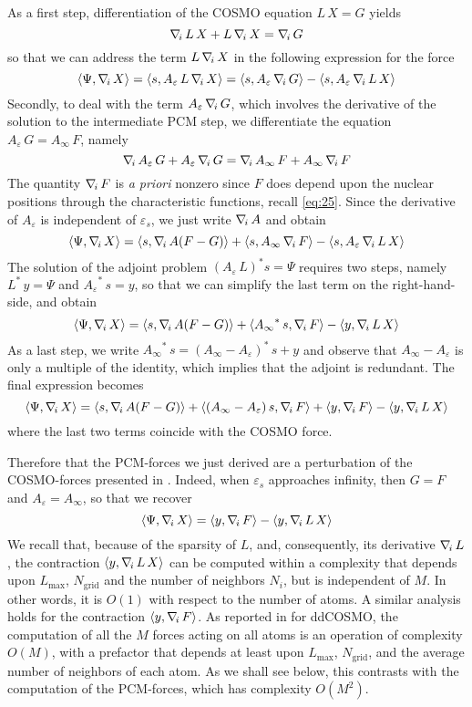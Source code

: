 As a first step, differentiation of the COSMO equation $L\, X = G$ yields
\[
\nabla_{\!i}\, L \, X + L \, \nabla_{\!i}\, X = \nabla_{\!i}\, G
\]
so that we can address the term $L \, \nabla_{\!i}\, X$ in the following expression for the force
\[
\langle \Psi , \nabla_{\!i}\, X\rangle  = \langle s ,  A_\varepsilon \, L \, \nabla_{\!i}\, X\rangle
 = \langle s ,  A_\varepsilon \, \nabla_{\!i}\, G \rangle - \langle s , A_\varepsilon \, \nabla_{\!i}\, L \,  X \rangle
\]
Secondly, to deal with the term $A_\varepsilon \, \nabla_{\!i}\, G$, which involves the derivative of the solution to the intermediate PCM step, we differentiate the equation $A_\varepsilon \, G = A_\infty \, F$, namely
\[
\nabla_{\!i}\, A_\varepsilon \, G + A_\varepsilon \, \nabla_{\!i}\, G = \nabla_{\!i}\, A_\infty \, F + A_\infty \, \nabla_{\!i}\, F
\]
The quantity $\nabla_{\!i}\, F$ is \emph{a priori} nonzero since $F$ does depend upon the nuclear positions through the characteristic functions, recall \eqref{eq:25}. Since the derivative of $A_\varepsilon$ is independent of $\varepsilon_s$, we just write $\nabla_{\!i}\, A$ and obtain
\[
\langle \Psi , \nabla_{\!i}\, X\rangle = \langle s , \nabla_{\!i}\,  A ( F - G ) \rangle + \langle  s ,{A_\infty}\, \nabla_{\!i}\, F \rangle - \langle  s , {A_\varepsilon}\, \nabla_{\!i}\, L \,  X \rangle
\]
The solution of the adjoint problem $(A_\varepsilon \, L )^* s = \Psi$ requires two steps, namely ${L}^* \, y = \Psi$ and ${A_\varepsilon}^* \, s = y$, so that we can simplify the last term on the right-hand-side, and obtain
\[
\langle \Psi , \nabla_{\!i}\, X\rangle = \langle s , \nabla_{\!i}\,  A ( F - G ) \rangle + \langle {A_\infty}^*\, s , \nabla_{\!i}\, F \rangle - \langle  y , \nabla_{\!i}\, L \,  X \rangle
\]
As a last step, we write ${A_\infty}^*\, s = ({A_\infty}-{A_\varepsilon})^*\, s + y$ and observe that ${A_\infty}-{A_\varepsilon} $ is only a multiple of the identity, which implies that the adjoint is redundant. The final expression becomes
\[
\langle \Psi , \nabla_{\!i}\, X\rangle = \langle s , \nabla_{\!i}\,  A ( F - G ) \rangle + \langle ({A_\infty}-{A_\varepsilon})\, s, \nabla_{\!i}\, F \rangle +\langle y , \nabla_{\!i}\, F \rangle - \langle  y , \nabla_{\!i}\, L \,  X \rangle
\]
where the last two terms coincide with the COSMO force.

Therefore that the PCM-forces we just derived are a perturbation of the COSMO-forces presented in \cite{Lipparini_JCTC_ddCOSMO}. Indeed, when $\varepsilon_s$ approaches infinity, then $G = F$ and $A_\varepsilon = {A_\infty} $, so that we recover
\[
\langle \Psi , \nabla_{\!i}\, X\rangle =  \langle y , \nabla_{\!i}\, F \rangle - \langle y , \nabla_{\!i}\, L \,  X \rangle
\]
We recall that, because of the sparsity of $L$, and, consequently, its derivative $\nabla_{\!i}\, L$, the contraction $\langle y ,\nabla_{\!i}\, L \, X\rangle$ can be computed within a complexity that depends upon $L_\text{max}$, $N_\text{grid}$ and the number of neighbors $N_i$, but is independent of $M$. In other words, it is $O(1)$ with respect to the number of atoms. A similar analysis holds for the contraction $\langle y , \nabla_{\!i}\, F \rangle$. As reported in \cite{Lipparini_JCTC_ddCOSMO} for ddCOSMO, the computation of all the $M$ forces acting on all atoms is an operation of complexity $O(M)$, with a prefactor that depends at least upon $L_\text{max}$, $N_\text{grid}$, and the average number of neighbors of each atom. As we shall see below, this contrasts with the computation of the PCM-forces, which has complexity $O(M^2)$.

